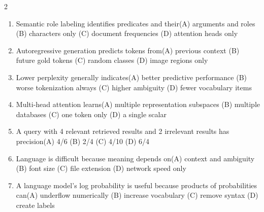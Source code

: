 \documentclass[a4paper]{article}
\begin{document}
\begin{multicols*}{2}
\begin{enumerate}
\item Semantic role labeling identifies predicates and their\newline\hspace*{0.6em}(A) arguments and roles \quad (B) characters only \newline\hspace*{0.6em}(C) document frequencies \quad (D) attention heads only
\item Autoregressive generation predicts tokens from\newline\hspace*{0.6em}(A) previous context \quad (B) future gold tokens \newline\hspace*{0.6em}(C) random classes \quad (D) image regions only
\item Lower perplexity generally indicates\newline\hspace*{0.6em}(A) better predictive performance \quad (B) worse tokenization always \newline\hspace*{0.6em}(C) higher ambiguity \quad (D) fewer vocabulary items
\item Multi-head attention learns\newline\hspace*{0.6em}(A) multiple representation subspaces \quad (B) multiple databases \newline\hspace*{0.6em}(C) one token only \quad (D) a single scalar
\item A query with 4 relevant retrieved results and 2 irrelevant results has precision\newline\hspace*{0.6em}(A) 4/6 \quad (B) 2/4 \newline\hspace*{0.6em}(C) 4/10 \quad (D) 6/4
\item Language is difficult because meaning depends on\newline\hspace*{0.6em}(A) context and ambiguity \quad (B) font size \newline\hspace*{0.6em}(C) file extension \quad (D) network speed only
\item A language model's log probability is useful because products of probabilities can\newline\hspace*{0.6em}(A) underflow numerically \quad (B) increase vocabulary \newline\hspace*{0.6em}(C) remove syntax \quad (D) create labels

\end{enumerate}
\end{multicols*}
\end{document}
